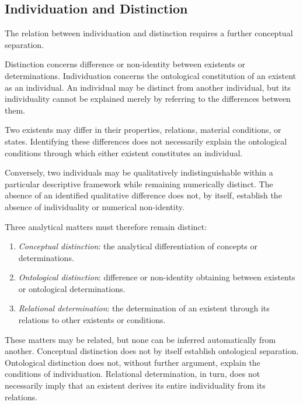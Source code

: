 \subsection{Individuation and Distinction}

The relation between individuation and distinction requires
a further conceptual separation.

Distinction concerns difference or non-identity between
existents or determinations. Individuation concerns the
ontological constitution of an existent as an individual.
An individual may be distinct from another individual, but
its individuality cannot be explained merely by referring
to the differences between them.

Two existents may differ in their properties, relations,
material conditions, or states. Identifying these differences
does not necessarily explain the ontological conditions through
which either existent constitutes an individual.

Conversely, two individuals may be qualitatively indistinguishable
within a particular descriptive framework while remaining
numerically distinct. The absence of an identified qualitative
difference does not, by itself, establish the absence of
individuality or numerical non-identity.

Three analytical matters must therefore remain distinct:

\begin{enumerate}
    \item \textit{Conceptual distinction}: the analytical
    differentiation of concepts or determinations.

    \item \textit{Ontological distinction}: difference or
    non-identity obtaining between existents or ontological
    determinations.

    \item \textit{Relational determination}: the determination
    of an existent through its relations to other existents
    or conditions.
\end{enumerate}

These matters may be related, but none can be inferred
automatically from another. Conceptual distinction does not
by itself establish ontological separation. Ontological
distinction does not, without further argument, explain the
conditions of individuation. Relational determination, in turn,
does not necessarily imply that an existent derives its entire
individuality from its relations.


